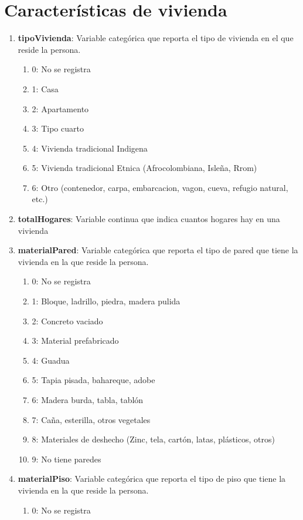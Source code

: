 \documentclass[12pt,a4paper]{article}
\begin{document}
\section{Características de vivienda}
\begin{enumerate}
	\item \textbf{tipoVivienda}: Variable categórica que reporta el tipo de vivienda en el que reside la persona.
		\begin{enumerate}
			\item 0: No se registra
			\item 1: Casa
			\item 2: Apartamento
			\item 3: Tipo cuarto
			\item 4: Vivienda tradicional Indigena
			\item 5: Vivienda tradicional Etnica (Afrocolombiana, Isleña, Rrom)
			\item 6: Otro (contenedor, carpa, embarcacion, vagon, cueva, refugio natural, etc.) 
		\end{enumerate}
	\item \textbf{totalHogares}: Variable continua que indica cuantos hogares hay en una vivienda
	\item \textbf{materialPared}: Variable categórica que reporta el tipo de pared que tiene la vivienda en la que reside la persona.
		\begin{enumerate}
			\item 0: No se registra
			\item 1: Bloque, ladrillo, piedra, madera pulida
			\item 2: Concreto vaciado
			\item 3: Material prefabricado
			\item 4: Guadua
			\item 5: Tapia pisada, bahareque, adobe
			\item 6: Madera burda, tabla, tablón
			\item 7: Caña, esterilla, otros vegetales
			\item 8: Materiales de deshecho (Zinc, tela, cartón, latas, plásticos, otros)
			\item 9: No tiene paredes
		\end{enumerate}
	\item \textbf{materialPiso}: Variable categórica que reporta el tipo de piso que tiene la vivienda en la que reside la persona.
		\begin{enumerate}
			\item 0: No se registra

\end{enumerate}
\end{enumerate}
\end{document}
